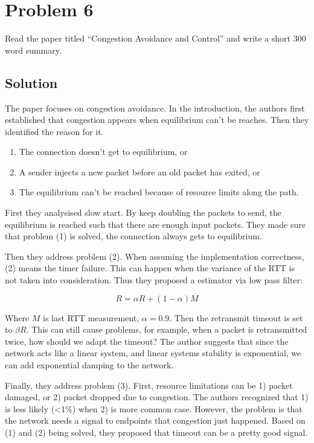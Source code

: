 
\section*{Problem 6}

Read the paper titled ``Congestion Avoidance and Control'' and write a short 300 word summary.

\subsection*{Solution}

The paper focuses on congestion avoidance.
In the introduction, the authors first established that congestion appears when equilibrium can't be reaches.
Then they identified the reason for it.

\begin{enumerate}
    \item The connection doesn’t get to equilibrium, or
    \item A sender injects a new packet before an old packet has exited, or
    \item The equilibrium can’t be reached because of resource limits along the path.
\end{enumerate}

First they analysised slow start.
By keep doubling the packets to send, the equilibrium is reached such that there are enough input packets.
They made sure that problem (1) is solved, the connection always gets to equilibrium.

Then they address problem (2).
When assuming the implementation correctness, (2) means the timer failure.
This can happen when the variance of the RTT is not taken into consideration.
Thus they proposed a estimator via low pass filter:

$$ R = \alpha R + (1-\alpha)M $$

Where $M$ is last RTT measurement, $\alpha = 0.9$.
Then the retransmit timeout is set to $\beta R$.
This can still cause problems, for example, when a packet is retransmitted twice, how should we adapt the timeout?
The author suggests that since the network acts like a linear system, and linear systems stability is exponential, we can add  exponential damping to the network.

Finally, they address problem (3).
First, resource limitations can be 1) packet damaged, or 2) packet dropped due to congestion.
The authors recognized that 1) is less likely (<1\%) when 2) is more common case.
However, the problem is that the network needs a signal to endpoints that congestion just happened.
Based on (1) and (2) being solved, they proposed that timeout can be a pretty good signal.

